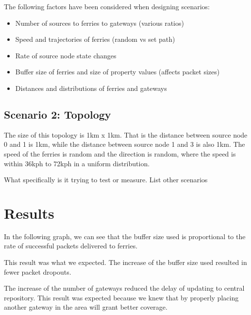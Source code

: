 The following factors have been considered when designing scenarios:
\begin{itemize}
\item Number of sources to ferries to gateways (various ratios)
\item Speed and trajectories of ferries (random vs set path)
\item Rate of source node state changes
\item Buffer size of ferries and size of property values (affects packet sizes)
\item Distances and distributions of ferries and gateways
\end{itemize}

\subsection{Scenario 2: Topology}

The size of this topology is 1km x 1km.  That is the distance between source node 0 and 1 is 1km, while the distance between source node 1 and 3 is also 1km.  
The speed of the ferries is random and the direction is random, where the speed is within 36kph to 72kph in a uniform distribution.  


What specifically is it trying to test or measure.
List other scenarios

\section{Results}

In the following graph, we can see that the buffer size used is proportional to the rate of successful packets delivered to ferries.


This result was what we expected.  The increase of the buffer size used resulted in fewer packet dropouts.


The increase of the number of gateways reduced the delay of updating to central repository.  
This result was expected because we knew that by properly placing another gateway in the area will grant better coverage.  
